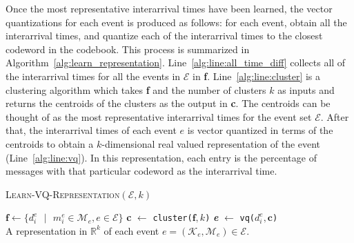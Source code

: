 Once the most representative interarrival times have been learned, the vector
quantizations for each event is produced as follows: 
%
for each event, obtain all the interarrival times, and quantize each of the
interarrival times to the closest codeword in the codebook.  
%
This process is summarized in Algorithm~\ref{alg:learn_representation}.
%
Line~\ref{alg:line:all_time_diff} collects all of the interarrival times for all
the events in $\mathcal{E}$ in \textbf{f}. 
%
Line~\ref{alg:line:cluster} is a clustering algorithm which takes \textbf{f} and
the number of clusters $k$ as inputs and returns the centroids of the clusters
as the output in \textbf{c}. 
%
The centroids can be thought of as the most representative interarrival times
for the event set $\mathcal{E}$. 
%
After that, the interarrival times of each event $e$ is vector quantized in
terms of the centroids to obtain a $k$-dimensional real valued representation of
the event (Line~\ref{alg:line:vq}). 
%
In this representation, each entry is the percentage of messages with that
particular codeword as the interarrival time.

\begin{algorithm}
  \caption{{\scshape Learn-VQ-Representation}$(\mathcal{E}, k)$}
  \label{alg:learn_representation}
  \begin{algorithmic}[1]
    \STATE $\textbf{f} \gets \{d_{i}^\mathit{e}\text{ } | \text{ } m_{\mathit{i}}^\mathit{e} \in
    \mathcal{M}_\mathit{e}, \mathit{e} \in \mathcal{E} \}$ \label{alg:line:all_time_diff}
    \STATE \textbf{c} $\gets$ {\tt cluster(}$\textbf{f}, k${\tt)} \label{alg:line:cluster}
      \STATE \textbf{\textit{e}} $\gets$ {\tt vq(}$d_{i}^\mathit{e}, \textbf{c}${\tt)}\\ \label{alg:line:vq}
    \ENDFOR
    \RETURN A representation in $\mathbb{R}^{k}$ of each event $\mathit{e} = (\mathcal{K}_\mathit{e}, \mathcal{M}_e) \in \mathcal{E}$.
  \end{algorithmic}
\end{algorithm}

